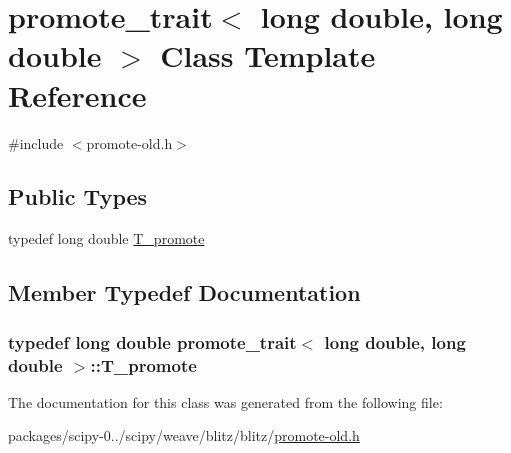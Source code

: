 \hypertarget{classpromote__trait_3_01long_01double_00_01long_01double_01_4}{}\section{promote\+\_\+trait$<$ long double, long double $>$ Class Template Reference}
\label{classpromote__trait_3_01long_01double_00_01long_01double_01_4}


{\ttfamily \#include $<$promote-\/old.\+h$>$}

\subsection*{Public Types}
\begin{DoxyCompactItemize}
\item 
typedef long double \hyperlink{classpromote__trait_3_01long_01double_00_01long_01double_01_4_a855a89776bbbe152bf56f1a71efc6cdd}{T\+\_\+promote}
\end{DoxyCompactItemize}


\subsection{Member Typedef Documentation}
\hypertarget{classpromote__trait_3_01long_01double_00_01long_01double_01_4_a855a89776bbbe152bf56f1a71efc6cdd}{}
\subsubsection[{T\+\_\+promote}]{\setlength{\rightskip}{0pt plus 5cm}typedef long double {\bf promote\+\_\+trait}$<$ long double, long double $>$\+::{\bf T\+\_\+promote}}\label{classpromote__trait_3_01long_01double_00_01long_01double_01_4_a855a89776bbbe152bf56f1a71efc6cdd}


The documentation for this class was generated from the following file\+:\begin{DoxyCompactItemize}
\item 
packages/scipy-\/0../scipy/weave/blitz/blitz/\hyperlink{promote-old_8h}{promote-\/old.\+h}\end{DoxyCompactItemize}
